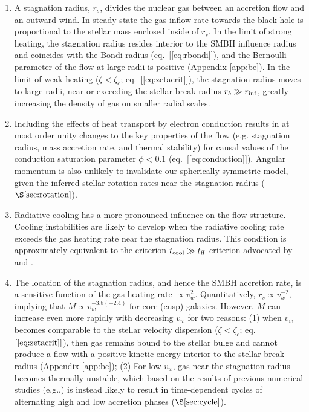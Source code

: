 \documentclass[usenatbib,fleqn]{mn2e}
\newcommand{\Mdot}{\dot{M}}
\newcommand{\rs}{r_s}
\begin{document}
  \begin{enumerate}
  \item A stagnation radius, $\rs$, divides the nuclear gas between an accretion flow and an
    outward wind. In steady-state the gas inflow rate towards the black hole is proportional to the
    stellar mass enclosed inside of $\rs$.  In the limit of strong heating, the stagnation radius resides interior to the SMBH influence radius and coincides with the Bondi radius (eq.~[\ref{eq:rbondi}]), and the Bernoulli parameter of the flow at large radii is positive (Appendix \ref{app:be}).  In the limit of weak heating ($\zeta < \zeta_c$; eq.~[\ref{eq:zetacrit}]), the stagnation radius moves to large radii, near or exceeding the stellar break radius $r_b \gg r_{\rm inf}$, greatly increasing the density of gas on smaller radial scales.  

\item Including the effects of heat transport by electron conduction results in at most order unity changes to the key properties of the flow (e.g. stagnation radius, mass accretion rate, and thermal stability) for causal values of the conduction saturation parameter $\phi < 0.1$ (eq.~[\ref{eq:conduction}]).  Angular momentum is also unlikely to invalidate our spherically symmetric model, given the inferred stellar rotation rates near the stagnation radius ($\S\ref{sec:rotation}$).

\item Radiative cooling has a more pronounced influence on the flow structure.  Cooling instabilities are likely to develop when the radiative cooling rate exceeds the gas heating rate near the stagnation radius.  This condition is approximately equivalent to the criterion $t_{\rm cool} \gg t_{\rm ff}$ criterion advocated by \citet{McCourt+12} and \citet{Li&Bryan14a}.   

  \item The location of the stagnation radius, and hence the SMBH accretion rate, is a sensitive function of the gas heating rate $\propto v_w^{2}$.  Quantitatively, $\rs\propto v_w^{-2}$, implying that $\Mdot\propto  v_w^{-3.8 (-2.4)}$ for core (cusp) galaxies.  However, $\Mdot$ can increase even more rapidly with decreasing $v_w$ for two reasons: (1) when $v_w$ becomes comparable to the stellar velocity dispersion ($\zeta < \zeta_c$; eq.~$[\ref{eq:zetacrit}]$), then gas remains bound to the stellar bulge and cannot produce a flow with a positive kinetic energy interior to the stellar break radius (Appendix \ref{app:be}); (2) For low $v_w$, gas near the stagnation radius becomes thermally unstable, which based on the results of previous numerical studies (e.g.,\citealt{Ciotti+10}) is instead likely to result in time-dependent cycles of alternating high and low accretion phases ($\S\ref{sec:cycle}$).


\end{enumerate}
\end{document}
